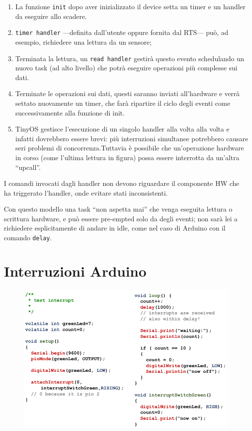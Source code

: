 \begin{enumerate}
   \item La funzione \texttt{init} dopo aver inizializzato il device setta un timer e un handler da eseguire allo scadere.
   \item \texttt{timer handler} ---definita dall'utente oppure fornita dal RTS--- può, ad esempio, richiedere una lettura da un sensore; 
   \item Terminata la lettura, un \texttt{read handler} gestirà questo evento schedulando un nuovo task (ad alto livello) che potrà eseguire operazioni più complesse sui dati.
   \item Terminate le operazioni sui dati, questi saranno inviati all'hardware e verrà settato nuovamente un timer, che farà ripartire il ciclo degli eventi come successivamente alla funzione di init.
   \item TinyOS gestisce l'esecuzione di un singolo handler alla volta alla volta e infatti dovrebbero essere brevi: più interruzioni simultanee potrebbero causare seri problemi di concorrenza.Tuttavia è possibile che un'operazione hardware in corso (come l'ultima lettura in figura) possa essere interrotta da un'altra ``upcall''.
\end{enumerate}
I comandi invocati dagli handler non devono riguardare il componente HW che ha triggerato l'handler, onde evitare stati inconsistenti.

Con questo modello una task ``non aspetta mai'' che venga eseguita lettura o scrittura hardware, e può essere pre-empted solo da degli eventi; non sarà lei a richiedere esplicitamente di andare in idle, come nel caso di Arduino con il comando \texttt{delay}.

\section{Interruzioni Arduino}

\begin{figure}[htbp]
   \centering
   \includegraphics{images/questions/Schermata del 2023-10-20 11-32-10.png}
   \label{fig:dom16}
\end{figure}


